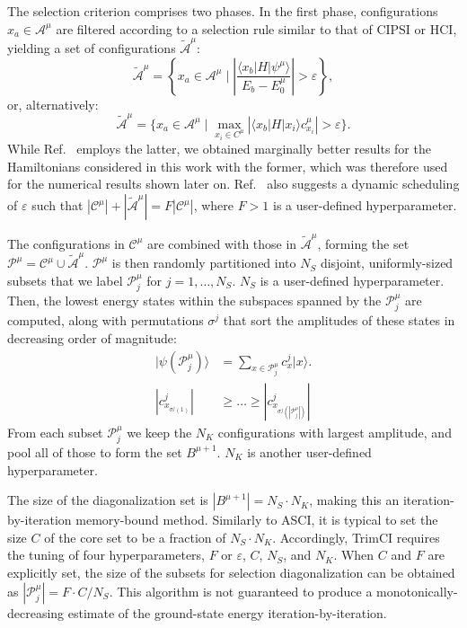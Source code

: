 \documentclass[
  reprint,            %
  amsmath,amssymb,
  aps,
  superscriptaddress, %
  longbibliography
]{revtex4-2}
\theoremstyle{definition}
\def\A{\mathcal{A}}
\def\C{\mathcal{C}}
\def\P{\mathcal{P}}
\begin{document}
\begin{itemize}
    The selection criterion comprises two phases. In the first phase, configurations $x_a \in \A^\mu$ are filtered according to a selection rule similar to that of CIPSI or HCI, yielding a set of configurations $\widetilde{\A}^\mu$:
    \begin{equation}
        \widetilde{\A}^\mu = \left\{x_a \in \A^\mu \; | \; \left|\frac{\langle x_b | H | \psi^\mu\rangle}{E_b - E_0^\mu} \right|> \varepsilon \right\},
    \end{equation}
    or, alternatively:
    \begin{equation}
        \widetilde{\A}^\mu = \{x_a \in \A^\mu \; | \;  \max_{x_i \in C^\mu}\left|\langle x_b| H |x_i \rangle c_{x_i}^\mu \right|> \varepsilon \}.
    \end{equation}
    While Ref.~\cite{zhang2025TrimCI_SCI} employs the latter, we obtained marginally better results for the Hamiltonians considered in this work with the former, which was therefore used for the numerical results shown later on. Ref.~\cite{zhang2025TrimCI_SCI} also suggests a dynamic scheduling of $\varepsilon$ such that $|\C^\mu| + |\widetilde{\A}^\mu| = F|\C^\mu| $, where $F>1$ is a user-defined hyperparameter.

    The configurations in $\C^\mu$ are combined with those in $\widetilde{\A}^\mu$, forming the set $\P^\mu = \C^\mu \cup \widetilde{\A}^\mu$. $\P^\mu$ is then randomly partitioned into $N_S$ disjoint, uniformly-sized subsets that we label $\P^\mu_j$ for $j = 1, \hdots, N_S$. $N_S$ is a user-defined hyperparameter. Then, the lowest energy states within the subspaces spanned by the $\P^\mu_j$ are computed, along with permutations $\sigma^j$ that sort the amplitudes of these states in decreasing order of magnitude:
    \begin{equation}
    \begin{split}
        |\psi(\P^\mu_j)\rangle & = \sum_{x \in \P^\mu_j} c^j_x|x\rangle. \\
        |c^j_{x_{\sigma^j(1)}}| & \ge \hdots \ge |c^j_{x_{\sigma^j(|\P^\mu_j|)}}|
        \end{split}
    \end{equation}
    From each subset $\P^\mu_j$ we keep the $N_K$ configurations with largest amplitude, and pool all of those to form the set $B^{\mu+1}$. $N_K$ is another user-defined hyperparameter.
    
    The size of the diagonalization set is $|B^{\mu + 1}| = N_S \cdot N_K$, making this an iteration-by-iteration memory-bound method. Similarly to ASCI, it is typical to set the size $C$ of the core set to be a fraction of $N_S \cdot N_K$. Accordingly, TrimCI requires the tuning of four hyperparameters, $F$ or $\varepsilon$, $C$, $N_S$, and $N_K$. When $C$ and $F$ are explicitly set, the size of the subsets for selection diagonalization can be obtained as $|\P^\mu_j| = F \cdot C/N_S$. This algorithm is not guaranteed to produce a monotonically-decreasing estimate of the ground-state energy iteration-by-iteration. 
\end{itemize}
\end{document}
